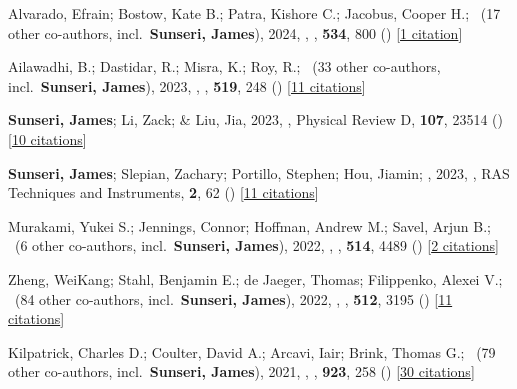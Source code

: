\item Alvarado, Efrain; Bostow, Kate B.; Patra, Kishore C.; Jacobus, Cooper H.; \etal\ ({17} other co-authors, incl.\ \textbf{Sunseri, James}), 2024, , \mnras, \textbf{534}, 800 () [\href{https://ui.adsabs.harvard.edu/abs/2024MNRAS.534..800A}{1 citation}]

\item Ailawadhi, B.; Dastidar, R.; Misra, K.; Roy, R.; \etal\ ({33} other co-authors, incl.\ \textbf{Sunseri, James}), 2023, , \mnras, \textbf{519}, 248 () [\href{https://ui.adsabs.harvard.edu/abs/2023MNRAS.519..248A}{11 citations}]

\item \textbf{Sunseri, James}; Li, Zack; \& Liu, Jia, 2023, , Physical Review D, \textbf{107}, 23514 () [\href{https://ui.adsabs.harvard.edu/abs/2023PhRvD.107b3514S}{10 citations}]

\item \textbf{Sunseri, James}; Slepian, Zachary; Portillo, Stephen; Hou, Jiamin; \etal, 2023, , RAS Techniques and Instruments, \textbf{2}, 62 () [\href{https://ui.adsabs.harvard.edu/abs/2023RASTI...2...62S}{11 citations}]

\item Murakami, Yukei S.; Jennings, Connor; Hoffman, Andrew M.; Savel, Arjun B.; \etal\ ({6} other co-authors, incl.\ \textbf{Sunseri, James}), 2022, , \mnras, \textbf{514}, 4489 () [\href{https://ui.adsabs.harvard.edu/abs/2022MNRAS.514.4489M}{2 citations}]

\item Zheng, WeiKang; Stahl, Benjamin E.; de Jaeger, Thomas; Filippenko, Alexei V.; \etal\ ({84} other co-authors, incl.\ \textbf{Sunseri, James}), 2022, , \mnras, \textbf{512}, 3195 () [\href{https://ui.adsabs.harvard.edu/abs/2022MNRAS.512.3195Z}{11 citations}]

\item Kilpatrick, Charles D.; Coulter, David A.; Arcavi, Iair; Brink, Thomas G.; \etal\ ({79} other co-authors, incl.\ \textbf{Sunseri, James}), 2021, , \apj, \textbf{923}, 258 () [\href{https://ui.adsabs.harvard.edu/abs/2021ApJ...923..258K}{30 citations}]